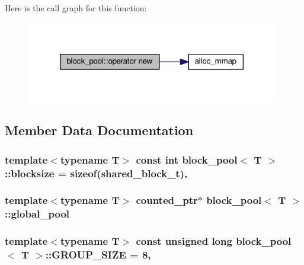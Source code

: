 Here is the call graph for this function\-:
\nopagebreak
\begin{figure}[H]
\begin{center}
\leavevmode
\includegraphics[width=312pt]{classblock__pool_a08b4e73a9dfc28489c291966d74138ae_cgraph}
\end{center}
\end{figure}




\subsection{Member Data Documentation}
\hypertarget{classblock__pool_adb521b667646ec43c3b6a28c8102976d}{
\subsubsection[{blocksize}]{\setlength{\rightskip}{0pt plus 5cm}template$<$typename T$>$ const int {\bf block\-\_\-pool}$<$ T $>$\-::blocksize = sizeof({\bf shared\-\_\-block\-\_\-t})\hspace{0.3cm}{\ttfamily [static]}, {\ttfamily [private]}}}\label{classblock__pool_adb521b667646ec43c3b6a28c8102976d}
\hypertarget{classblock__pool_af780642743ad9cc26764304a8d1c4d62}{
\subsubsection[{global\-\_\-pool}]{\setlength{\rightskip}{0pt plus 5cm}template$<$typename T$>$ {\bf counted\-\_\-ptr}$\ast$ {\bf block\-\_\-pool}$<$ T $>$\-::global\-\_\-pool\hspace{0.3cm}{\ttfamily [private]}}}\label{classblock__pool_af780642743ad9cc26764304a8d1c4d62}
\hypertarget{classblock__pool_aeb02a4c80a65b806e3fadcba29f07262}{
\subsubsection[{G\-R\-O\-U\-P\-\_\-\-S\-I\-Z\-E}]{\setlength{\rightskip}{0pt plus 5cm}template$<$typename T$>$ const unsigned long {\bf block\-\_\-pool}$<$ T $>$\-::G\-R\-O\-U\-P\-\_\-\-S\-I\-Z\-E = 8\hspace{0.3cm}{\ttfamily [static]}, {\ttfamily [private]}}}\label{classblock__pool_aeb02a4c80a65b806e3fadcba29f07262}
